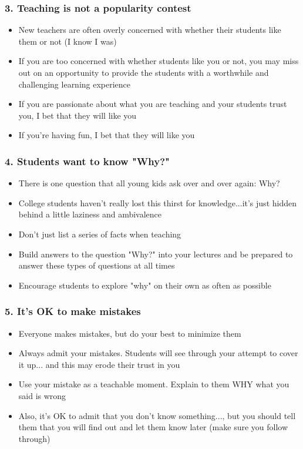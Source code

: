 \documentclass{beamer}
\begin{document}
\begin{frame}
\frametitle{3. Teaching is not a popularity contest}
\begin{itemize}
	\pause 
  \item New teachers are often overly concerned with whether their students like them or not
  	\pause (I know I was)
	\pause
  \item If you are too concerned with whether students like you or not, you may miss out on an opportunity to provide the students with a worthwhile and challenging learning experience
  	\pause
  \item If you are passionate about what you are teaching \pause and your students \alert{trust} you, \pause I bet that they will like you
  	\pause
  \item If you're having fun, I bet that they will like you
  \end{itemize}
\end{frame}

\begin{frame}
\frametitle{4. Students want to know "Why?"}
\begin{itemize}
	\pause 
  \item There is one question that all young kids ask over and over again: \pause \alert{Why?}
  	\pause
  \item College students haven't really lost this thirst for knowledge...\pause it's just hidden behind a little laziness and ambivalence
  	\pause 
  \item Don't just list a series of facts when teaching
  	\pause
  \item Build answers to the question "Why?" into your lectures and be prepared to answer these types of questions at all times
      	\pause 
  \item Encourage students to explore "why" on their own as often as possible
\end{itemize}
\end{frame}

\begin{frame}
\frametitle{5. It's OK to make mistakes}
\begin{itemize}
	\pause 
  \item Everyone makes mistakes, but do your best to minimize them
    	\pause 
  \item Always admit your mistakes.    \pause  Students will see through your attempt to cover it up... \pause and this may erode their trust in you
    	\pause
  \item Use your mistake as a teachable moment.  \pause Explain to them \alert{WHY} what you said is wrong
  	\pause
  \item Also, it's OK to admit that you don't know something...\pause, but you should tell them that you will find out and let them know later (make sure you follow through)
\end{itemize}
\end{frame}
\end{document}
